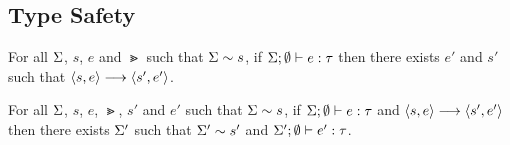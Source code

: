 \documentclass{article}
\begin{document}
\subsection{Type Safety}
\begin{theorem}[Progress]
    For all $\Sigma$, $s$, $e$ and $\Gt$ such that $\Sigma\sim s$,
    if $\Sigma;\emptyset \vdash e : \tau$
    then there exists $e'$ and $s'$ such that
    $\left\langle {s,e} \right\rangle \longrightarrow \left\langle {s',e'} \right\rangle$.
\end{theorem}

\begin{theorem}[Preservation]
    For all $\Sigma$, $s$, $e$, $\Gt$, $s'$ and $e'$
    such that $\Sigma\sim s$,
    if $\Sigma;\emptyset \vdash e : \tau$
    and $\left\langle {s,e} \right\rangle \longrightarrow \left\langle {s',e'} \right\rangle$ then there exists
    $\Sigma'$ such that $\Sigma'\sim s'$ and
    $\Sigma';\emptyset \vdash e' : \tau$.
\end{theorem}
\end{document}
